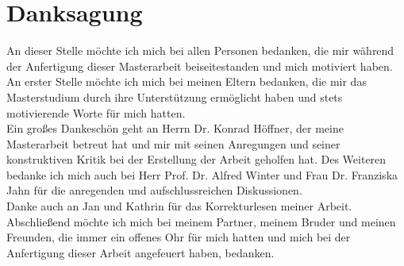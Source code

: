 




\begingroup
\let\clearpage\relax
\let\cleardoublepage\relax
\let\cleardoublepage\relax
\chapter*{Danksagung}
An dieser Stelle möchte ich mich bei allen Personen bedanken, die mir während der Anfertigung dieser Masterarbeit beiseitestanden und mich motiviert haben. \\

An erster Stelle möchte ich mich bei meinen Eltern bedanken, die mir das Masterstudium durch ihre Unterstützung ermöglicht haben und stets motivierende Worte für mich hatten. \\

Ein großes Dankeschön geht an Herrn Dr. Konrad Höffner, der meine Masterarbeit betreut hat und mir mit seinen Anregungen und seiner konstruktiven Kritik bei der Erstellung der Arbeit geholfen hat. Des Weiteren bedanke ich mich auch bei Herr Prof. Dr. Alfred Winter und Frau Dr. Franziska Jahn für die anregenden und aufschlussreichen Diskussionen. \\

Danke auch an Jan und Kathrin für das Korrekturlesen meiner Arbeit. \\

Abschließend möchte ich mich bei meinem Partner, meinem Bruder und meinen Freunden, die immer ein offenes Ohr für mich hatten und mich bei der Anfertigung dieser Arbeit angefeuert haben, bedanken.

\endgroup
